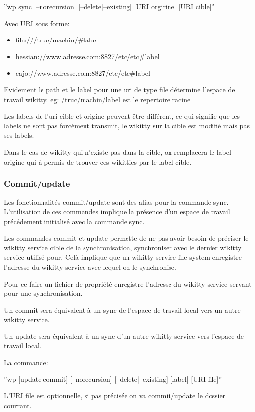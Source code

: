 ''wp sync [--norecursion] [--delete|--existing] [URI orgirine] [URI cible]''

Avec URI sous forme: 
\begin{itemize}
\item file:///truc/machin/\#label
\item hessian://www.adresse.com:8827/etc/etc\#label
\item cajo://www.adresse.com:8827/etc/etc\#label
\end{itemize}

Evidement le path et le label pour une uri de type file détermine l'espace de
travail wikitty. eg: /truc/machin/label est le repertoire racine

Les labels de l'uri cible et origine peuvent être différent, ce qui signifie que
les labels ne sont pas forcément transmit, le wikitty sur la cible est modifié
mais pas ses labels.

Dans le cas de wikitty qui n'existe pas dans la cible, on remplacera le label
origine qui à permis de trouver ces wikitties par le label cible.

\subsubsection{Commit/update}

Les fonctionnalités commit/update sont des alias pour la commande sync.
L'utilisation de ces commandes implique la présence d'un espace de travail
précédement initialisé avec la commande sync.

Les commandes commit et update permette de ne pas avoir besoin de préciser le
wikitty service cible de la synchronisation, synchroniser avec le dernier
wikitty service utilisé pour. Celà implique que un wikitty service file system
enregistre l'adresse du wikitty service avec lequel on le synchronise.

Pour ce faire un fichier de propriété enregistre l'adresse du wikitty service
servant pour une synchronisation.

Un commit sera équivalent à un sync de l'espace de travail local vers un autre
wikitty service. 

Un update sera équivalent à un sync d'un autre wikitty service vers l'espace de
travail local.

La commande:

''wp [update|commit] [--norecursion] [--delete|--existing] [label] [URI file]''

L'URI file est optionnelle, si pas précisée on va commit/update le dossier 
courrant.

